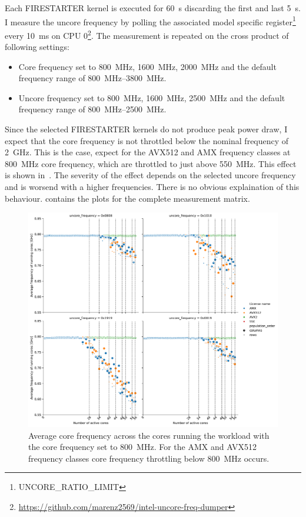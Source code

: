 Each FIRESTARTER kernel is executed for \SI{60}{\s} discarding the first and last \SI{5}{\s}.
I measure the uncore frequency by polling the associated model specific register\footnote{UNCORE\_RATIO\_LIMIT} every \SI{10}{\ms} on CPU 0\footnote{\url{https://github.com/marenz2569/intel-uncore-freq-dumper}}.
The measurement is repeated on the cross product of following settings:
\begin{itemize}
    \item Core frequency set to \SI{800}{\MHz}, \SI{1600}{\MHz}, \SI{2000}{\MHz} and the default frequency range of \SI{800}{\MHz}--\SI{3800}{\MHz}.
    \item Uncore frequency set to \SI{800}{\MHz}, \SI{1600}{\MHz}, \SI{2500}{\MHz} and the default frequency range of \SI{800}{\MHz}--\SI{2500}{\MHz}.
\end{itemize}

Since the selected FIRESTARTER kernels do not produce peak power draw, I expect that the core frequency is not throttled below the nominal frequency of \SI{2}{\GHz}.
This is the case, expect for the AVX512 and AMX frequency classes at \SI{800}{\MHz} core frequency, which are throttled to just above \SI{550}{\MHz}.
This effect is shown in~.
The severity of the effect depends on the selected uncore frequency and is worsend with a higher frequencies.
There is no obvious explaination of this behaviour.
 contains the plots for the complete measurement matrix.

\begin{figure}[]
    \centering
    \includegraphics[width=0.8\columnwidth]{fig/avx-frequency-license-bands-without-isst-core-frequency-800.pdf}
    \caption{\label{fig:avx-anomalies-low-freq}Average core frequency across the cores running the workload with the core frequency set to \SI{800}{\MHz}. For the AMX and AVX512 frequency classes core frequency throttling below \SI{800}{\MHz} occurs.}
\end{figure}

